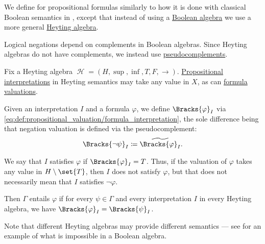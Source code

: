 \begin{definition}\label{def:propositional_heyting_algebra_semantics}
  We define  for propositional formulas similarly to how it is done with classical Boolean semantics in , except that instead of using a \hyperref[def:boolean_algebra]{Boolean algebra} we use a more general \hyperref[def:heyting_algebra]{Heyting algebra}.

  Logical negations depend on complements in Boolean algebras. Since Heyting algebras do not have complements, we instead use \hyperref[def:heyting_algebra/pseudocomplement]{pseudocomplements}.

  Fix a Heyting algebra \( \mscrH = (H, \sup, \inf, T, F, \rightarrow) \). \hyperref[def:propositional_valuation/interpretation]{Propositional interpretations} in Heyting semantics may take any value in \( X \), as can \hyperref[def:propositional_valuation/formula_valuation]{formula valuations}.

  Given an interpretation \( I \) and a formula \( \varphi \), we define \( \Bracks{\varphi}_I \) via \eqref{eq:def:propositional_valuation/formula_interpretation}, the sole difference being that negation valuation is defined via the pseudocomplement:
  \begin{equation*}
    \Bracks{\neg \psi}_I \coloneqq \widetilde{\Bracks{\varphi}_I}.
  \end{equation*}

  We say that \( I \) satisfies \( \varphi \) if \( \Bracks{\varphi}_I = T \). Thus, if the valuation of \( \varphi \) takes any value in \( H \setminus \set{ T } \), then \( I \) does not satisfy \( \varphi \), but that does not necessarily mean that \( I \) satisfies \( \neg \varphi \).

  Then \( \Gamma \) entails \( \varphi \) if for every \( \psi \in \Gamma \) and every interpretation \( I \) in every Heyting algebra, we have \( \Bracks{\varphi}_I = \Bracks{\psi}_I \).

  Note that different Heyting algebras may provide different semantics --- see  for an example of what is impossible in a Boolean algebra.
\end{definition}

